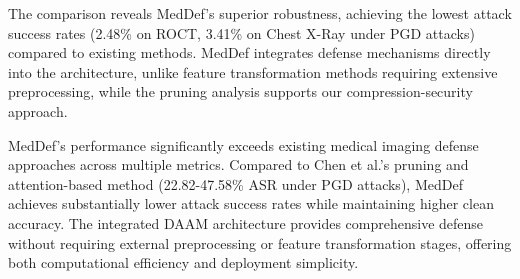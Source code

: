 \documentclass[preprint,12pt]{elsarticle}
\begin{document}
\begin{table}[!t]
\caption{STATE-OF-THE-ART COMPARISON: MEDDEF PERFORMANCE AGAINST EXISTING ADVERSARIAL DEFENSE METHODS IN MEDICAL IMAGING. ASR = ATTACK SUCCESS RATE (LOWER IS BETTER).}
\label{table:sota}
\centering
\renewcommand{\arraystretch}{1.2}
\end{table}

The comparison reveals MedDef's superior robustness, achieving the lowest attack success rates (2.48\% on ROCT, 3.41\% on Chest X-Ray under PGD attacks) compared to existing methods. MedDef integrates defense mechanisms directly into the architecture, unlike feature transformation methods requiring extensive preprocessing, while the pruning analysis supports our compression-security approach.

MedDef's performance significantly exceeds existing medical imaging defense approaches across multiple metrics. Compared to Chen et al.'s pruning and attention-based method (22.82-47.58\% ASR under PGD attacks), MedDef achieves substantially lower attack success rates while maintaining higher clean accuracy. The integrated DAAM architecture provides comprehensive defense without requiring external preprocessing or feature transformation stages, offering both computational efficiency and deployment simplicity.
\end{document}
